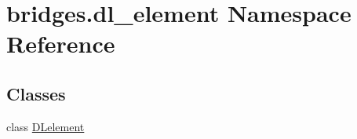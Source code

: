 \hypertarget{namespacebridges_1_1dl__element}{}\section{bridges.\+dl\+\_\+element Namespace Reference}
\label{namespacebridges_1_1dl__element}
\subsection*{Classes}
\begin{DoxyCompactItemize}
\item 
class \mbox{\hyperlink{classbridges_1_1dl__element_1_1_d_lelement}{D\+Lelement}}
\end{DoxyCompactItemize}
